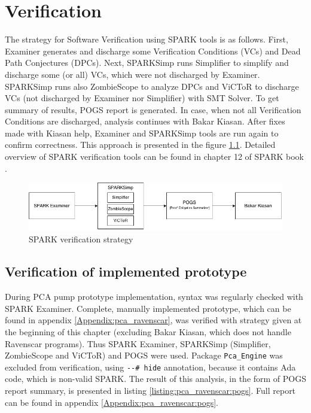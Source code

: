 
\cleardoublepage

\chapter{Verification}
\label{verification}


The strategy for Software Verification using SPARK tools is as follows. First, Examiner generates and discharge some Verification Conditions (VCs) and Dead Path Conjectures (DPCs). Next, SPARKSimp runs Simplifier to simplify and discharge some (or all) VCs, which were not discharged by Examiner. SPARKSimp runs also ZombieScope to analyze DPCs and ViCToR to discharge VCs (not discharged by Examiner nor Simplifier) with SMT Solver. To get summary of results, POGS report is generated. In case, when not all Verification Conditions are discharged, analysis continues with Bakar Kiasan. After fixes made with Kiasan help, Examiner and SPARKSimp tools are run again to confirm correctness. This approach is presented in the figure \ref{figure:sparkverificationstrategy}. Detailed overview of SPARK verification tools can be found in chapter 12 of SPARK book \cite{Barnes:Book}.

\begin{figure}[ht]%
    \begin{center}
        \includegraphics[width=1.0\textwidth]{figures/spark-verification.png}        
    \end{center}
    \caption{SPARK verification strategy}
    \label{figure:sparkverificationstrategy}
\end{figure}

\section{Verification of implemented prototype}
\label{verification:prototype}

During PCA pump prototype implementation, syntax was regularly checked with SPARK Examiner. Complete, manually implemented prototype, which can be found in appendix \ref{Appendix:pca_ravenscar}, was verified with strategy given at the beginning of this chapter (excluding Bakar Kiasan, which does not handle Ravenscar programs). Thus SPARK Examiner, SPARKSimp (Simplifier, ZombieScope and ViCToR) and POGS were used. Package \lstinline{Pca_Engine} was excluded from verification, using \lstinline{--# hide} annotation, because it contains Ada code, which is non-valid SPARK. The result of this analysis, in the form of POGS report summary, is presented in listing \ref{listing:pca_ravenscar:pogs}. Full report can be found in appendix \ref{Appendix:pca_ravenscar:pogs}.

